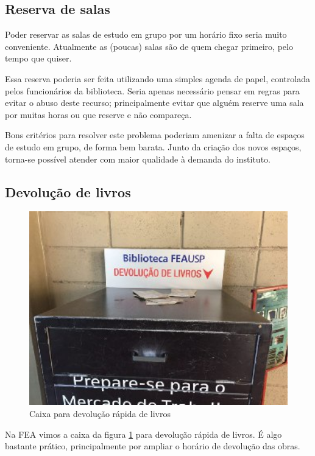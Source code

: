 \documentclass[titlepage]{article}
\begin{document}
\subsection{Reserva de salas}
Poder reservar as salas de estudo em grupo por um horário fixo seria muito 
conveniente. Atualmente as (poucas) salas são de quem chegar primeiro, pelo 
tempo que quiser.

Essa reserva poderia ser feita utilizando uma simples agenda de papel, 
controlada pelos funcionários da biblioteca. Seria apenas necessário pensar em
regras para evitar o abuso deste recurso; principalmente evitar que alguém 
reserve uma sala por muitas horas ou que reserve e não compareça.

Bons critérios para resolver este problema poderiam amenizar a falta de espaços
de estudo em grupo, de forma bem barata. Junto da criação dos novos espaços,
torna-se possível atender com maior qualidade à demanda do instituto.

\subsection{Devolução de livros}
\begin{figure}[ht!]
\caption{Caixa para devolução rápida de livros}
\label{fig:caixa}
\centering
\includegraphics[width=1\textwidth]{caixa}
\end{figure}

Na FEA vimos a caixa da figura \ref{fig:caixa} para devolução rápida de livros.
É algo bastante prático, principalmente por ampliar o horário de devolução das
obras.
\end{document}
